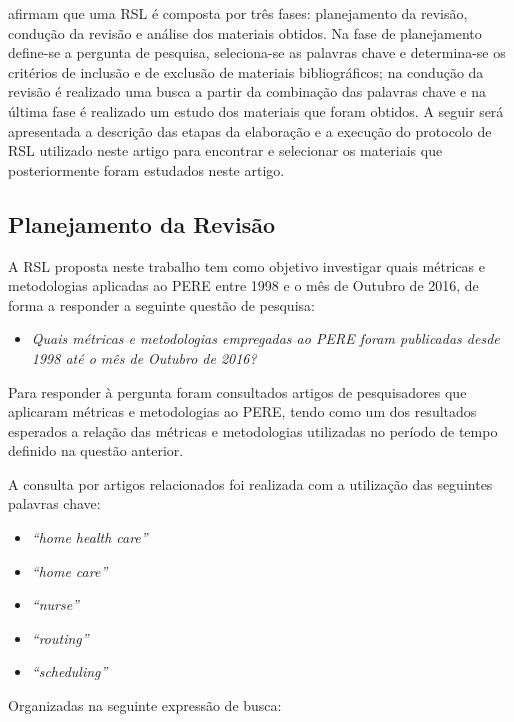  afirmam que uma \ac{RSL} é  composta por três fases: planejamento da revisão, condução da revisão e análise dos materiais obtidos.
Na fase de planejamento define-se a pergunta de pesquisa, seleciona-se as palavras chave e determina-se os critérios de inclusão e de exclusão de materiais bibliográficos; na condução da revisão é realizado uma busca a partir da combinação das palavras chave e na última fase  é realizado um estudo dos materiais que foram obtidos. A seguir será apresentada a descrição das etapas da elaboração e a execução do protocolo de \ac{RSL} utilizado neste artigo para encontrar e selecionar os materiais que posteriormente foram estudados neste artigo.

\subsection{Planejamento da Revisão}

A \acl{RSL} proposta neste trabalho tem como objetivo investigar quais métricas e metodologias aplicadas ao \ac{PERE} entre 1998 e o mês de Outubro de 2016, de forma a responder a seguinte questão de pesquisa:

\begin{itemize}
\item \emph{Quais métricas e metodologias empregadas ao \acl{PERE} foram publicadas desde 1998 até o mês de Outubro de 2016?}
\end{itemize}

Para responder à pergunta foram consultados artigos de pesquisadores que aplicaram métricas e metodologias ao \ac{PERE}, tendo como um dos resultados esperados a relação das métricas e metodologias utilizadas no período de tempo definido na questão anterior. 

A consulta por artigos relacionados foi realizada com a utilização das seguintes palavras chave:

\begin{itemize}
\item \textit{``home health care''}
\item \textit{``home care''}
\item \textit{``nurse''}
\item \textit{``routing''}
\item \textit{``scheduling''}
\end{itemize}

Organizadas na seguinte expressão de busca:

